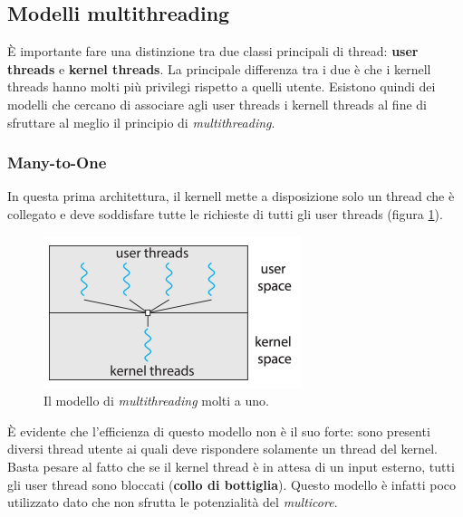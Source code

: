 \subsection{Modelli multithreading}
È importante fare una distinzione tra due classi principali di thread: \textbf{user threads} e \textbf{kernel threads}. La principale differenza tra i due è che i kernell threads hanno molti più privilegi rispetto a quelli utente. Esistono quindi dei modelli che cercano di associare agli user threads i kernell threads al fine di sfruttare al meglio il principio di \textit{multithreading}.

\subsubsection{Many-to-One}
In questa prima architettura, il kernell mette a disposizione solo un thread che è collegato e deve soddisfare tutte le richieste di tutti gli user threads (figura \ref{fig:many_to_one}).
\begin{figure}[!h]
    \centering
    \includegraphics[width = .5\textwidth]{../res/imgs/threads/many_to_one.png}
    \caption{Il modello di \textit{multithreading} molti a uno.}
    \label{fig:many_to_one}
\end{figure}
È evidente che l'efficienza di questo modello non è il suo forte: sono presenti diversi thread utente ai quali deve rispondere solamente un thread del kernel. Basta pesare al fatto che se il kernel thread è in attesa di un input esterno, tutti gli user thread sono bloccati (\textbf{collo di bottiglia}). Questo modello è infatti poco utilizzato dato che non sfrutta le potenzialità del \textit{multicore}. 
% 
